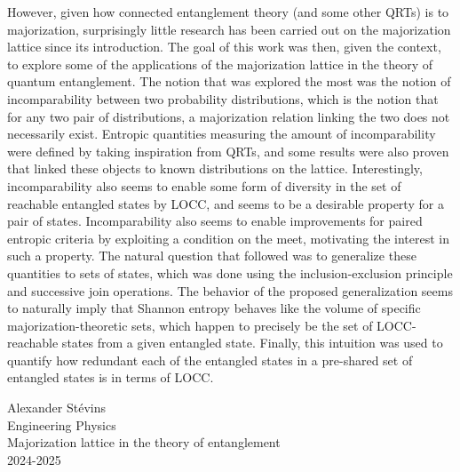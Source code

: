 However, given how connected entanglement theory (and some other QRTs) is to majorization, surprisingly little research has been carried out on the majorization lattice since its introduction. The goal of this work was then, given the context, to explore some of the applications of the majorization lattice in the theory of quantum entanglement. The notion that was explored the most was the notion of incomparability between two probability distributions, which is the notion that for any two pair of distributions, a majorization relation linking the two does not necessarily exist. Entropic quantities measuring the amount of incomparability were defined by taking inspiration from QRTs, and some results were also proven that linked these objects to known distributions on the lattice. Interestingly, incomparability also seems to enable some form of diversity in the set of reachable entangled states by LOCC, and seems to be a desirable property for a pair of states. Incomparability also seems to enable improvements for paired entropic criteria by exploiting a condition on the meet, motivating the interest in such a property. The natural question that followed was to generalize these quantities to sets of states, which was done using the inclusion-exclusion principle and successive join operations. The behavior of the proposed generalization seems to naturally imply that Shannon entropy behaves like the volume of specific majorization-theoretic sets, which happen to precisely be the set of LOCC-reachable states from a given entangled state. Finally, this intuition was used to quantify how redundant each of the entangled states in a pre-shared set of entangled states is in terms of LOCC.




\vspace*{\fill}
\noindent Alexander Stévins\\
Engineering Physics\\
Majorization lattice in the theory of entanglement\\
2024-2025


